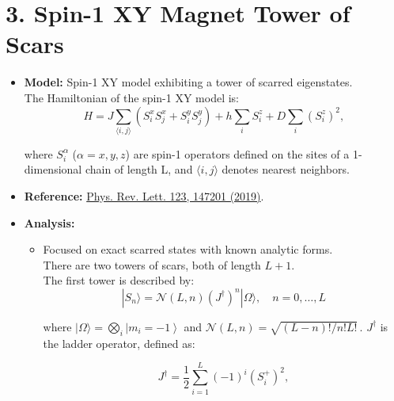 \documentclass[11pt]{article}
\begin{document}
\section*{3. Spin-1 XY Magnet Tower of Scars}
\begin{itemize}
    \item \textbf{Model:} Spin-1 XY model exhibiting a tower of scarred eigenstates.\\
    The Hamiltonian of the spin-1 XY model is:
	\begin{equation}\label{eqq}
	H = J \sum_{\langle i,j \rangle} \left( S^x_i S^x_j + S^y_i S^y_j \right) 
	+ h \sum_i S^z_i + D \sum_i \left(S^z_i\right)^2,
	\end{equation}
	
	where $S^\alpha_i$ ($\alpha = x, y, z$) are spin-1 operators defined on the sites of a 1-dimensional chain of length L, and $\langle i,j \rangle$ denotes nearest neighbors.  

	
    \item \textbf{Reference:} \href{https://journals.aps.org/prl/abstract/10.1103/PhysRevLett.123.147201}{Phys. Rev. Lett. 123, 147201 (2019)}.
    \item \textbf{Analysis:}
    \begin{itemize}
        \item Focused on exact scarred states with known analytic forms.\\ There are two towers of scars, both of length $L+1$.\\
    The first tower is described by:
	    \begin{equation}
	|S_n\rangle = \mathcal{N}(L, n) \left(J^\dagger\right)^n |\Omega\rangle, \quad n = 0,\hdots,L
	\end{equation}
	
	where $|\Omega\rangle = \bigotimes_i \left| m_i = -1 \right\rangle$ and $\mathcal{N}(L, n) = \sqrt{(L-n)!/n!L!}\,$. $J^\dagger$ is the ladder operator, defined as:
	
	\begin{equation}
	J^\dagger = \frac{1}{2}\sum_{i=1}^{L} (-1)^i \left(S^+_i\right)^2, 
	\end{equation}
	

\end{itemize}
\end{itemize}
\end{document}
